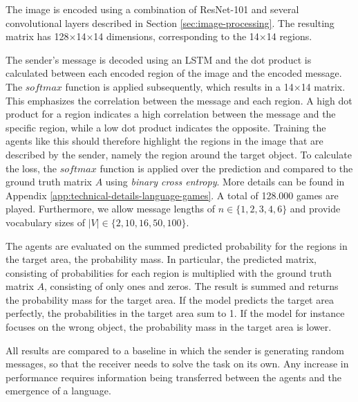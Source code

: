 \documentclass[11pt,a4paper]{article}
\begin{document}
The image is encoded using a combination of ResNet-101 and several convolutional layers described in Section \ref{sec:image-processing}.
The resulting matrix has 128$\times$14$\times$14 dimensions, corresponding to the 14$\times$14 regions.

The sender's message is decoded using an LSTM and the dot product is calculated between each encoded region of the image and the encoded message.
The $softmax$ function is applied subsequently, which results in a 14$\times$14 matrix.
This emphasizes the correlation between the message and each region.
A high dot product for a region indicates a high correlation between the message and the specific region, while a low dot product indicates the opposite.
Training the agents like this should therefore highlight the regions in the image that are described by the sender, namely the region around the target object.
To calculate the loss, the $softmax$ function is applied over the prediction and compared to the ground truth matrix $A$ using \emph{binary cross entropy}.
More details can be found in Appendix \ref{app:technical-details-language-games}.
A total of 128.000 games are played.
Furthermore, we allow message lengths of $n \in \{1,2,3,4,6\}$ and provide vocabulary sizes of $|V| \in \{2,10,16,50,100\}$.

The agents are evaluated on the summed predicted probability for the regions in the target area, the probability mass.
In particular, the predicted matrix, consisting of probabilities for each region is multiplied with the ground truth matrix $A$, consisting of only ones and zeros.
The result is summed and returns the probability mass for the target area.
If the model predicts the target area perfectly, the probabilities in the target area sum to 1.
If the model for instance focuses on the wrong object, the probability mass in the target area is lower.

All results are compared to a baseline in which the sender is generating random messages, so that the receiver needs to solve the task on its own.
Any increase in performance requires information being transferred between the agents and the emergence of a language.

\end{document}
